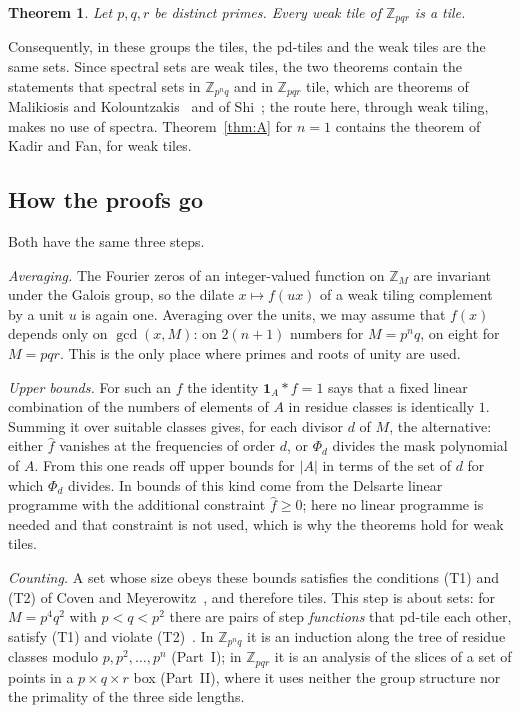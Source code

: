 \documentclass[11pt,a4paper]{amsart}
\newtheorem{theorem}{Theorem}
\theoremstyle{definition}
\theoremstyle{remark}
\newcommand{\Z}{\mathbb{Z}}
\newcommand{\one}{\mathbf{1}}
\begin{document}
\begin{theorem}\label{thm:B}
Let $p,q,r$ be distinct primes. Every weak tile of $\Z_{pqr}$ is a tile.
\end{theorem}

\noindent Consequently, in these groups the tiles, the pd-tiles and the weak tiles are the same sets. Since
spectral sets are weak tiles, the two theorems contain the statements that spectral sets in $\Z_{p^nq}$ and in
$\Z_{pqr}$ tile, which are theorems of Malikiosis and Kolountzakis~\cite{MK} and of Shi~\cite{Shi}; the route
here, through weak tiling, makes no use of spectra. Theorem~\ref{thm:A} for $n=1$ contains the theorem of Kadir and Fan, for weak tiles.

\subsection*{How the proofs go} Both have the same three steps.

\emph{Averaging.} The Fourier zeros of an integer-valued function on $\Z_M$ are invariant under the Galois
group, so the dilate $x\mapsto f(ux)$ of a weak tiling complement by a unit $u$ is again one. Averaging over the
units, we may assume that $f(x)$ depends only on $\gcd(x,M)$: on $2(n+1)$ numbers for $M=p^nq$, on eight for
$M=pqr$. This is the only place where primes and roots of unity are used.

\emph{Upper bounds.} For such an $f$ the identity $\one_A*f=1$ says that a fixed linear combination of the
numbers of elements of $A$ in residue classes is identically $1$. Summing it over suitable classes gives, for
each divisor $d$ of $M$, the alternative: either $\hat f$ vanishes at the frequencies of order $d$, or $\Phi_d$
divides the mask polynomial of $A$. From this one reads off upper bounds for $|A|$ in terms of the set of $d$
for which $\Phi_d$ divides. In \cite{KLMS,KF} bounds of this kind come from the Delsarte linear programme with
the additional constraint $\hat f\ge 0$; here no linear programme is needed and that constraint is not used,
which is why the theorems hold for weak tiles.

\emph{Counting.} A set whose size obeys these bounds satisfies the conditions (T1) and (T2) of Coven and
Meyerowitz~\cite{CM}, and therefore tiles. This step is about sets: for $M=p^4q^2$ with $p<q<p^2$ there are pairs of
step \emph{functions} that pd-tile each other, satisfy (T1) and violate (T2)~\cite{KLMS}. In $\Z_{p^nq}$ it is an induction along
the tree of residue classes modulo $p,p^2,\dots,p^n$ (Part~I); in $\Z_{pqr}$ it is an analysis of the slices of
a set of points in a $p\times q\times r$ box (Part~II), where it uses neither the group structure nor the
primality of the three side lengths.
\end{document}
